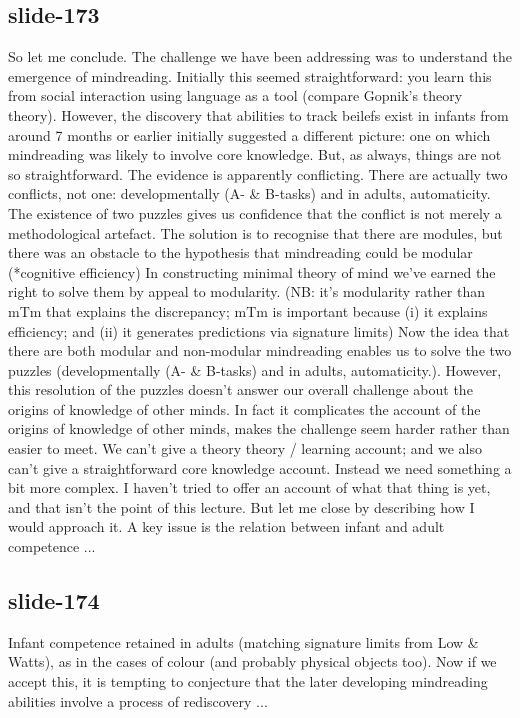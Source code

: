 \documentclass[12pt,\papersize]{extarticle}
\begin{document}
\subsection{slide-173}
So let me conclude.
The challenge we have been addressing was to understand the emergence of mindreading.
Initially this seemed straightforward: you learn this from social interaction using language as a tool (compare Gopnik's theory theory).
However, the discovery that abilities to track beilefs exist in infants from around 7 months or earlier initially suggested a different picture:
one on which mindreading was likely to involve core knowledge.
But, as always, things are not so straightforward. The evidence is apparently conflicting.
There are actually two conflicts, not one: developmentally (A- \& B-tasks) and in adults, automaticity.
The existence of two puzzles gives us confidence that the conflict is not merely a methodological artefact.
The solution is to recognise that there are modules, but there was an obstacle to the hypothesis that mindreading could be modular (*cognitive efficiency)
In constructing minimal theory of mind we've earned the right to solve them by appeal to modularity. (NB: it's modularity rather than mTm that explains the discrepancy; mTm is important because (i) it explains efficiency; and (ii) it generates predictions via signature limits)
Now the idea that there are both modular and non-modular mindreading enables us to solve the two puzzles (developmentally (A- \& B-tasks) and in adults, automaticity.).
However, this resolution of the puzzles doesn't answer our overall challenge about the origins of knowledge of other minds.
In fact it complicates the account of the origins of knowledge of other minds, makes the challenge seem harder rather than easier to meet.
We can't give a theory theory / learning account; and we also can't give a straightforward core knowledge account.
Instead we need something a bit more complex.
I haven't tried to offer an account of what that thing is yet, and that isn't the point of this lecture.
But let me close by describing how I would approach it.
A key issue is the relation between infant and adult competence ...
 
 
\subsection{slide-174}
Infant competence retained in adults (matching signature limits from Low \& Watts), as in the cases of colour (and probably physical objects too).
Now if we accept this, it is tempting to conjecture that the later developing mindreading abilities involve a process of rediscovery ...
 
\end{document}
